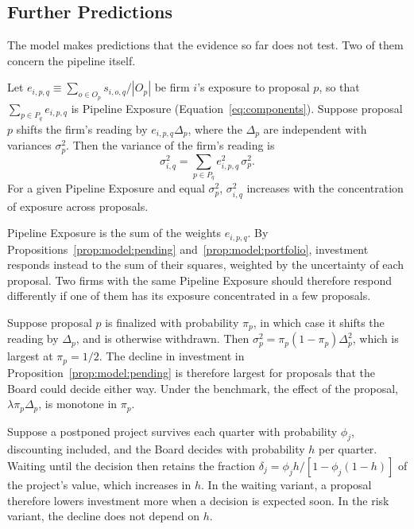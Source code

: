 \subsection{Further Predictions}\label{sec:model:further}

The model makes predictions that the evidence so far does not test. Two of them concern the pipeline itself.

\begin{proposition}\label{prop:model:portfolio}
Let $e_{i,p,q}\equiv\sum_{o\in O_p}s_{i,o,q}/|O_p|$ be firm $i$'s exposure to proposal $p$, so that $\sum_{p\in P_q}e_{i,p,q}$ is Pipeline Exposure (Equation~\eqref{eq:components}). Suppose proposal $p$ shifts the firm's reading by $e_{i,p,q}\Delta_p$, where the $\Delta_p$ are independent with variances $\sigma_p^{2}$. Then the variance of the firm's reading is
\[
  \sigma_{i,q}^{2}=\sum_{p\in P_q}e_{i,p,q}^{2}\,\sigma_p^{2}.
\]
For a given Pipeline Exposure and equal $\sigma_p^{2}$, $\sigma_{i,q}^{2}$ increases with the concentration of exposure across proposals.
\end{proposition}

Pipeline Exposure is the sum of the weights $e_{i,p,q}$. By Propositions~\ref{prop:model:pending} and~\ref{prop:model:portfolio}, investment responds instead to the sum of their squares, weighted by the uncertainty of each proposal. Two firms with the same Pipeline Exposure should therefore respond differently if one of them has its exposure concentrated in a few proposals.

\begin{proposition}\label{prop:model:contested}
Suppose proposal $p$ is finalized with probability $\pi_p$, in which case it shifts the reading by $\Delta_p$, and is otherwise withdrawn. Then $\sigma_p^{2}=\pi_p(1-\pi_p)\Delta_p^{2}$, which is largest at $\pi_p=1/2$. The decline in investment in Proposition~\ref{prop:model:pending} is therefore largest for proposals that the Board could decide either way. Under the benchmark, the effect of the proposal, $\lambda\pi_p\Delta_p$, is monotone in $\pi_p$.
\end{proposition}

\begin{remark}\label{rem:model:hazard}
Suppose a postponed project survives each quarter with probability $\phi_j$, discounting included, and the Board decides with probability $h$ per quarter. Waiting until the decision then retains the fraction $\delta_j=\phi_jh/[1-\phi_j(1-h)]$ of the project's value, which increases in $h$. In the waiting variant, a proposal therefore lowers investment more when a decision is expected soon. In the risk variant, the decline does not depend on $h$.
\end{remark}

